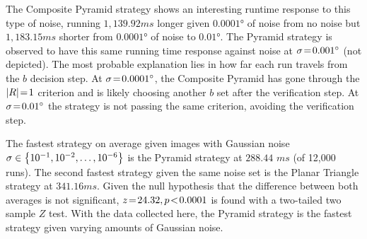 The Composite Pyramid strategy shows an interesting runtime response to this type of noise, running $1{,}139.92\si{ms}$ longer given $\ang{0.0001}$ of noise from no noise but $1{,}183.15\si{ms}$ shorter from $\ang{0.0001}$ of noise to $\ang{0.01}$.
The Pyramid strategy is observed to have this same running time response against noise at $\sigma\!=\!\ang{0.001}$ (not depicted).
The most probable explanation lies in how far each run travels from the $b$ decision step.
At $\sigma\!=\!\ang{0.0001}$, the Composite Pyramid has gone through the $\left| R \right| \!=\! 1$ criterion and is likely choosing another $b$ set after the verification step.
At $\sigma\!=\!\ang{0.01}$ the strategy is not passing the same criterion, avoiding the verification step.

%
%
%
%
The fastest strategy on average given images with Gaussian noise $\sigma \in \left\{ 10^{-1}, 10^{-2}, \ldots, 10^{-6} \right\}$ is the Pyramid strategy at $288.44$ $\si{ms}$ (of 12,000 runs).
The second fastest strategy given the same noise set is the Planar Triangle strategy at $341.16\si{ms}$.
Given the null hypothesis that the difference between both averages is not significant, $z \!=\! 24.32, p\!<\!0.0001$ is found with a two-tailed two sample $Z$ test.
With the data collected here, the Pyramid strategy is the fastest strategy given varying amounts of Gaussian noise.

